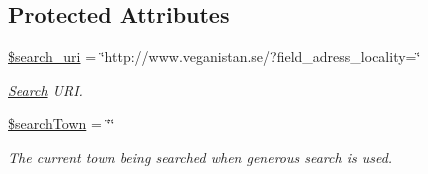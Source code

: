 \subsection*{Protected Attributes}
\begin{DoxyCompactItemize}
\item 
\hyperlink{class_search_adbc71d7a9ff28a661af822ca70dfeefa}{\$search\+\_\+uri} = \char`\"{}http\+://www.\+veganistan.\+se/?field\+\_\+adress\+\_\+locality=\char`\"{}
\begin{DoxyCompactList}\small\item\em \hyperlink{class_search}{Search} U\+RI. \end{DoxyCompactList}\item 
\hyperlink{class_search_a0bdf2816de59f8db308bc03285152358}{\$search\+Town} = \char`\"{}\char`\"{}
\begin{DoxyCompactList}\small\item\em The current town being searched when generous search is used. \end{DoxyCompactList}\end{DoxyCompactItemize}
